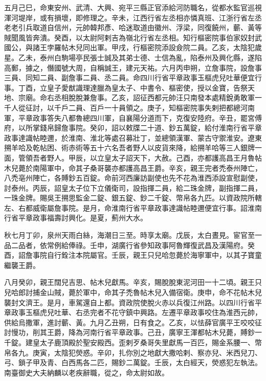 \begin{pinyinscope}
 五月己巳，命東安州、武清、大興、宛平三縣正官添給河防職名，從都水監官巡視渾河堤岸，或有損壞，即修理之。辛未，江西行省左丞相亦憐真班、江浙行省左丞老老引兵取道自信州，元帥韓邦彥、哈迷取道由徽州、浮梁，同復饒州，蘄、黃等賊聞風皆奔潰。癸酉，以太尉阿剌吉為嶺北行省左丞相。知行樞密院事伯家奴封武國公，與諸王孛羅帖木兒同出軍。甲戌，行樞密院添設僉院二員。乙亥，太陰犯歲星。乙未，泰州白駒場亭民張士誠及其弟士德、士信為亂，陷泰州及興化縣，遂陷高郵，據之，僭國號大周，自稱誠王，建元天祐。六月丙申朔，立詹事院，設詹事三員、同知二員、副詹事二員、丞二員。命四川行省平章政事玉樞虎兒吐華便宜行事。丁酉，立皇子愛猷識理達臘為皇太子、中書令、樞密使，授以金寶，告祭天地、宗廟。命右丞相脫脫兼詹事。乙亥，詔征西都元帥汪只南發本處精銳勇敢軍一千人從征討，以千戶二員、百戶一十員領之。庚子，知樞密院事失剌把都總河南軍，平章政事答失八都魯總四川軍，自襄陽分道而下，克復安陸府。辛丑，罷宮傅府，以所掌錢帛歸詹事院。癸卯，詔以敕牒二十道、鈔五萬錠，給付淮南行省平章政事達識帖睦邇，於淮南、淮北等處召募壯丁，並總領漢軍、蒙古守禦淮安。遼東搠羊哈及乾帖困、術赤術等五十六名吾者野人以皮貨來降，給搠羊哈等三人銀牌一面，管領吾者野人。甲辰，以立皇太子詔天下，大赦。己酉，亦都護高昌王月魯帖木兒薨於南陽軍中，命其子桑哥襲亦都護高昌王爵。辛亥，親王完者禿泰州陣亡，八禿亳州陣亡，各賻鈔五百錠。命前河西廉訪副使也先不花為淮西添設宣慰副使，討泰州。丙辰，詔皇太子位下立儀衛司，設指揮二員，給二珠金牌，副指揮二員，一珠金牌。賜吳王搠思監金二錠、銀五錠、鈔二千錠、幣帛各九匹。以資政院所轄左、右都威衛屬詹事院。是月，命淮南行省平章政事達識帖睦邇便宜行事。詔淮南行省平章政事福壽討興化。是夏，薊州大水。



 秋七月丁卯，泉州天雨白絲，海潮日三至。時享太廟。戊辰，太白晝見。宦官至一品二品者，依常例給俸祿。壬申，湖廣行省參知政事阿魯輝復武昌及漢陽府。癸酉，詔詹事院自行銓注本院屬官。壬辰，親王只兒哈忽薨於海寧軍中，以其子寶童繼襲王爵。



 八月癸卯，親王闊兒吉思、帖木兒獻馬。辛亥，賜脫脫東泥河田一十二頃。親王只兒哈郎討捕金山賊，薨於軍中，命其子禿魯帖木兒入備宿衛。庚申，命不花帖木兒襲封文濟王。是月，車駕還自上都。資政院使脫火赤以兵復江州路。以四川行省平章政事玉樞虎兒吐華、右丞完者不花守鎮中興路。左遷平章政事咬住為淮西元帥，供給烏撒軍，進討蘄、黃。九月乙丑朔，日有食之。乙亥，以怯薛官廣平王咬咬征討慢功，削其王爵，降為河南行省平章政事。己丑，廣寧王渾都帖木兒薨，賻鈔一千錠。建皇太子鹿頂殿於聖安殿西。歪剌歹桑哥失里獻馬一百匹，賜金系腰一、幣帛各九。庚寅，太陰犯熒惑。辛卯，扎你別之地獻大撒哈剌、察亦兒、米西兒刀、弓、鎖子甲及青、白西馬各二匹，賜鈔二萬錠。壬辰，太白經天，熒惑犯左執法。南臺御史大夫納麟以老疾辭職，從之，命太尉如故。




\end{pinyinscope}
